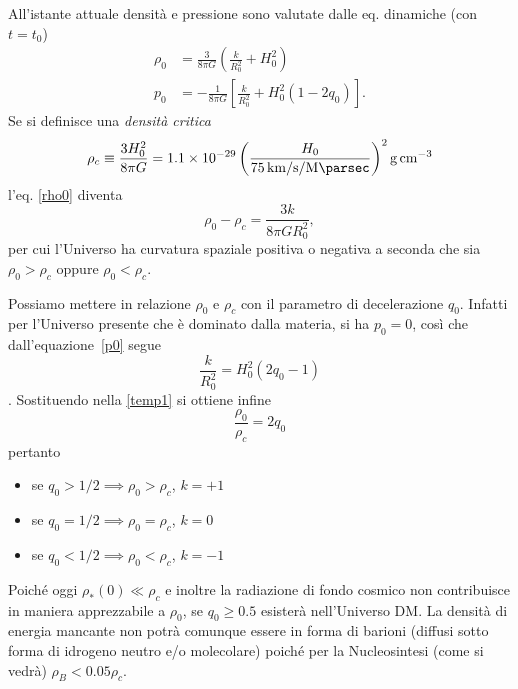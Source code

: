 All'istante attuale densità e pressione sono valutate dalle eq. dinamiche (con $t=t_0$)
\begin{subequations}
  \begin{align}
    \label{rho0}
    \rho_0  &= \frac{3}{8 \pi G} \left(\frac{k}{R_0^2} + H_0^2 \right) \\
    \label{p0}
    p_0 &= -\frac{1}{8 \pi G} \left[\frac {k}{R_0^2}+H_0^2(1-2q_0)\right].
  \end{align}
\end{subequations}
Se si definisce una \emph{densità critica}
\begin{equation}
  \rho_c \equiv  \frac{3 H_0^2}{8 \pi G} = 1.1 \times 10^{-29}
  \left(
    \frac{H_0}{\SI[per-mode=reciprocal]{75}{\kilo\metre \per \second \per
        \mega\parsec}}
  \right)^2
  \si{\gram\per\centi\metre\cubed}
  \label{rhoc}
\end{equation}
l'eq. \eqref{rho0} diventa
\begin{equation}
  \rho_0-\rho_c =  \frac{3 k}{8 \pi G R_0^2},
  \label{temp1}
\end{equation}
per cui l'Universo ha curvatura spaziale positiva o negativa a seconda che sia
$\rho_0 > \rho_c$ oppure $\rho_0 < \rho_c$.

Possiamo mettere in relazione $\rho_0$ e $\rho_c$ con il parametro di
decelerazione $q_0$.  Infatti per l'Universo presente che è dominato dalla
materia, si ha $p_0=0$, così che dall'equazione~\eqref{p0} segue
\begin{equation}
  \frac{k}{R_0^2} = H_0^2 (2q_0-1)
\end{equation}.
Sostituendo nella \eqref{temp1} si ottiene infine
\begin{equation}
  \frac{\rho_0}{\rho_c}=2 q_0
  \label{rho0surhoc}
\end{equation}
pertanto
\begin{itemize}
\item se $q_0 > 1/2 \implies \rho_0>\rho_c$, $k=+1$
\item se $q_0 = 1/2 \implies \rho_0=\rho_c$, $k=0$
\item se $q_0 < 1/2 \implies \rho_0<\rho_c$, $k=-1$
\end{itemize}

Poiché oggi $\rho_*(0) \ll \rho_c$ e inoltre la radiazione di fondo cosmico non
contribuisce in maniera apprezzabile a $\rho_0$, se $q_0 \ge 0.5$ esisterà
nell'Universo DM.  La densità di energia mancante non potrà comunque essere in
forma di barioni (diffusi sotto forma di idrogeno neutro e/o molecolare) poiché
per la Nucleosintesi (come si vedrà) $\rho_B < 0.05 \rho_c$.

